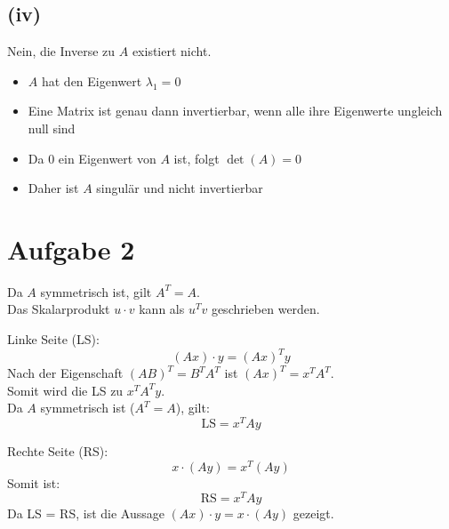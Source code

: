 \documentclass{article}
\begin{document}
\subsection*{(iv)}

Nein, die Inverse zu $A$ existiert nicht.

\begin{itemize}
\item $A$ hat den Eigenwert $\lambda_1 = 0$
\item Eine Matrix ist genau dann invertierbar, wenn alle ihre Eigenwerte ungleich null sind
\item Da $0$ ein Eigenwert von $A$ ist, folgt $\det(A) = 0$
\item Daher ist $A$ singulär und nicht invertierbar
\end{itemize}

\section*{Aufgabe 2}
Da \(A\) symmetrisch ist, gilt \(A^T = A\). \\
Das Skalarprodukt \(u \cdot v\) kann als \(u^T v\) geschrieben werden.

Linke Seite (LS):
\[ (Ax) \cdot y = (Ax)^T y \]
Nach der Eigenschaft \((AB)^T = B^T A^T\) ist \((Ax)^T = x^T A^T\). \\
Somit wird die LS zu \(x^T A^T y\). \\
Da \(A\) symmetrisch ist (\(A^T = A\)), gilt:
\[ \text{LS} = x^T A y \]

Rechte Seite (RS):
\[ x \cdot (Ay) = x^T (Ay) \]
Somit ist:
\[ \text{RS} = x^T A y \]
Da LS = RS, ist die Aussage \((Ax) \cdot y = x \cdot (Ay)\) gezeigt.
\end{document}
